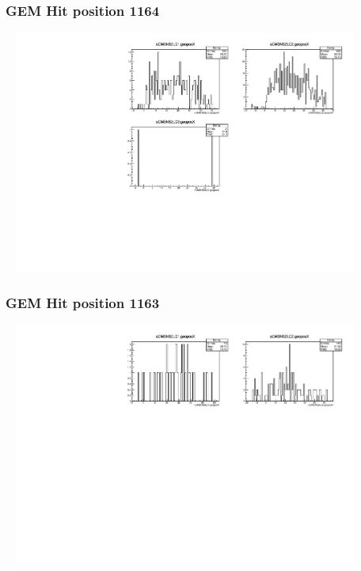 \documentclass[slidestop,compress,mathserif]{beamer}
\begin{document}
\begin{frame}\frametitle{GEM Hit position 1164}
	 \includegraphics[width=12cm,height=8cm]{GEM_Hit_position_1164.pdf}
\end{frame}
\begin{frame}\frametitle{GEM Hit position 1163}
	 \includegraphics[width=12cm,height=8cm]{GEM_Hit_position_1163.pdf}
\end{frame}
\end{document}
